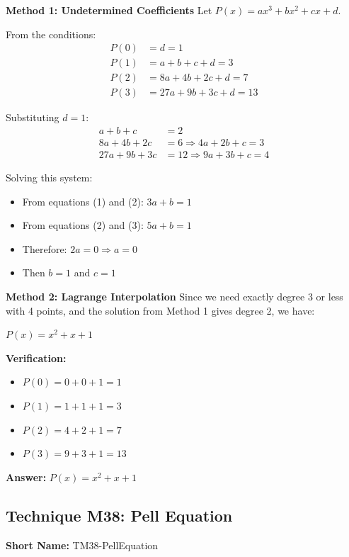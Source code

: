 \documentclass[12pt]{article}
\newenvironment{solution}
{\begin{tcolorbox}[colback=green!5!white,colframe=green!75!black,title={Solution}]}{\end{tcolorbox}}
\begin{document}
\begin{solution}
\textbf{Method 1: Undetermined Coefficients}
Let $P(x) = ax^3 + bx^2 + cx + d$.

From the conditions:
\begin{align}
P(0) &= d = 1\\
P(1) &= a + b + c + d = 3\\
P(2) &= 8a + 4b + 2c + d = 7\\
P(3) &= 27a + 9b + 3c + d = 13
\end{align}

Substituting $d = 1$:
\begin{align}
a + b + c &= 2\\
8a + 4b + 2c &= 6 \Rightarrow 4a + 2b + c = 3\\
27a + 9b + 3c &= 12 \Rightarrow 9a + 3b + c = 4
\end{align}

Solving this system:
\begin{itemize}
    \item From equations (1) and (2): $3a + b = 1$
    \item From equations (2) and (3): $5a + b = 1$
    \item Therefore: $2a = 0 \Rightarrow a = 0$
    \item Then $b = 1$ and $c = 1$
\end{itemize}

\textbf{Method 2: Lagrange Interpolation}
Since we need exactly degree 3 or less with 4 points, and the solution from Method 1 gives degree 2, we have:

$P(x) = x^2 + x + 1$

\textbf{Verification:}
\begin{itemize}
    \item $P(0) = 0 + 0 + 1 = 1$ \checkmark
    \item $P(1) = 1 + 1 + 1 = 3$ \checkmark  
    \item $P(2) = 4 + 2 + 1 = 7$ \checkmark
    \item $P(3) = 9 + 3 + 1 = 13$ \checkmark
\end{itemize}

\textbf{Answer:} $P(x) = x^2 + x + 1$
\end{solution}

\subsection{Technique M38: Pell Equation}
\textbf{Short Name:} TM38-PellEquation
\end{document}
